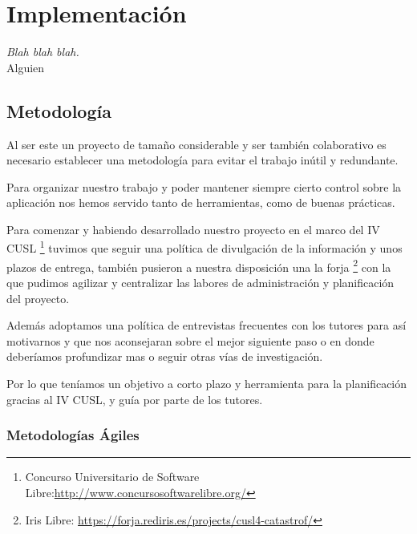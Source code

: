 
\chapter*{Implementación} \label{cap5}

\begin{flushright}
\begin{minipage}{7.85cm}
    {\em Blah blah blah.} \\  Alguien
\end{minipage}
\end{flushright}

\vspace*{5mm}

\section*{Metodología}
Al ser este un proyecto de tamaño considerable y ser también colaborativo es
necesario establecer una metodología para evitar el trabajo inútil y redundante.

Para organizar nuestro trabajo y poder mantener siempre cierto control sobre la
aplicación nos hemos servido tanto de herramientas, como de buenas prácticas.

Para comenzar y habiendo desarrollado nuestro proyecto en el marco del IV CUSL
\footnote{Concurso Universitario de
Software Libre:\url{http://www.concursosoftwarelibre.org/}} tuvimos que seguir
una política de divulgación de la información y unos plazos de entrega, también
pusieron a nuestra disposición una la forja
\footnote{Iris Libre: \url{https://forja.rediris.es/projects/cusl4-catastrof/}}
con la que pudimos agilizar y centralizar las labores de administración y
planificación del proyecto.

Además adoptamos una política de entrevistas frecuentes con los tutores para
así motivarnos y que nos aconsejaran sobre el mejor siguiente paso o en donde
deberíamos profundizar mas o seguir otras vías de investigación.

Por lo que teníamos un objetivo a corto plazo y herramienta para la
planificación gracias al  IV CUSL, y guía por parte de los tutores.

\subsection*{Metodologías Ágiles}

